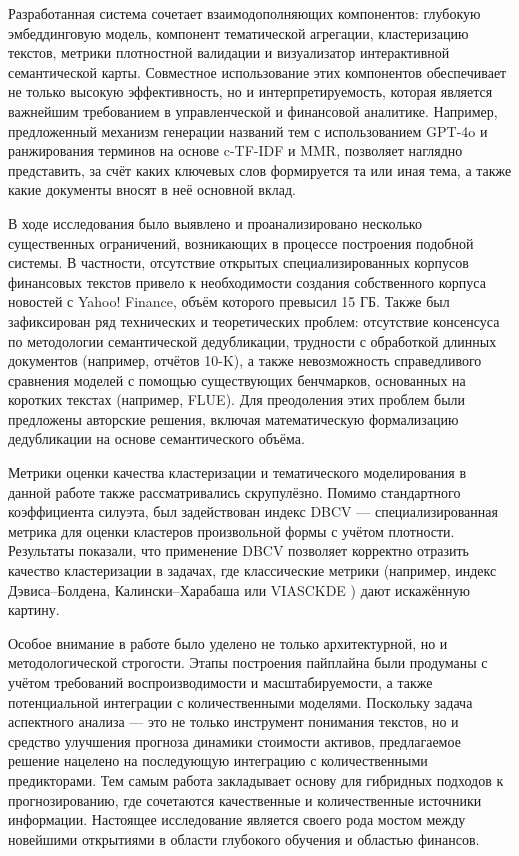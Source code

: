Разработанная система сочетает  взаимодополняющих компонентов: глубокую эмбеддинговую модель,
компонент тематической агрегации, кластеризацию текстов, метрики плотностной валидации и визуализатор
интерактивной семантической карты. Совместное использование этих компонентов обеспечивает не только высокую
эффективность, но и интерпретируемость, которая является важнейшим требованием в управленческой и финансовой
аналитике. Например, предложенный механизм генерации названий тем с использованием GPT-4o и ранжирования
терминов на основе c-TF-IDF и MMR, позволяет наглядно представить, за счёт каких ключевых слов формируется
та или иная тема, а также какие документы вносят в неё основной вклад.

В ходе исследования было выявлено и проанализировано несколько существенных ограничений, возникающих
в процессе построения подобной системы. В частности, отсутствие открытых специализированных корпусов
финансовых текстов привело к необходимости создания собственного корпуса новостей с Yahoo! Finance, объём
которого превысил 15 ГБ. Также был зафиксирован ряд технических и теоретических проблем: отсутствие
консенсуса по методологии семантической дедубликации, трудности с обработкой длинных документов (например,
отчётов 10-K), а также невозможность справедливого сравнения моделей с помощью существующих бенчмарков,
основанных на коротких текстах (например, FLUE). Для преодоления этих проблем были предложены авторские
решения, включая математическую формализацию дедубликации на основе семантического объёма.

Метрики оценки качества кластеризации и тематического моделирования в данной работе также рассматривались
скрупулёзно. Помимо стандартного коэффициента силуэта, был задействован индекс DBCV --- специализированная
метрика для оценки кластеров произвольной формы с учётом плотности. Результаты показали, что применение
DBCV позволяет корректно отразить качество кластеризации в задачах, где классические метрики (например,
индекс Дэвиса–Болдена, Калински–Харабаша или VIASCKDE ) дают искажённую картину.

Особое внимание в работе было уделено не только архитектурной, но и методологической строгости. Этапы
построения пайплайна были продуманы с учётом требований воспроизводимости и масштабируемости, а также
потенциальной интеграции с количественными моделями. Поскольку задача аспектного анализа --- это не только
инструмент понимания текстов, но и средство улучшения прогноза динамики стоимости активов, предлагаемое
решение нацелено на последующую интеграцию с количественными предикторами. Тем самым работа закладывает
основу для гибридных подходов к прогнозированию, где сочетаются качественные и количественные источники
информации. Настоящее исследование является своего рода мостом между новейшими открытиями в области глубокого
обучения и областью финансов.

